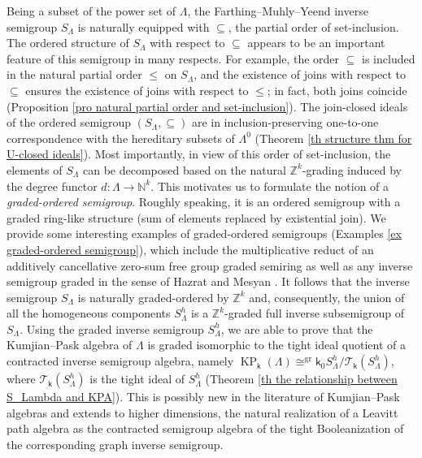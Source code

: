 \documentclass[a4paper,reqno,11pt]{amsart}
\numberwithin{equation}{section}
\theoremstyle{definition}
\theoremstyle{remark}
\newcommand{\gr}{\operatorname{gr}}
\newcommand{\KP}{\operatorname{KP}}
\begin{document}
Being a subset of the power set of $\Lambda$, the Farthing--Muhly--Yeend inverse semigroup $S_\Lambda$ is naturally equipped with $\subseteq$, the partial order of set-inclusion. The ordered structure of $S_\Lambda$ with respect to $\subseteq$ appears to be an important feature of this semigroup in many respects. For example, the order $\subseteq$ is included in the natural partial order $\le$ on $S_\Lambda$, and the existence of joins with respect to $\subseteq$ ensures the existence of joins with respect to $\le$; in fact, both joins coincide (Proposition \ref{pro natural partial order and set-inclusion}). The join-closed ideals of the ordered semigroup $(S_\Lambda,\subseteq)$ are in inclusion-preserving one-to-one correspondence with the hereditary subsets of $\Lambda^0$ (Theorem \ref{th structure thm for U-closed ideals}). Most importantly, in view of this order of set-inclusion, the elements of $S_\Lambda$ can be decomposed based on the natural $\mathbb{Z}^k$-grading induced by the degree functor $d:\Lambda\longrightarrow \mathbb{N}^k$. This motivates us to formulate the notion of a \emph{graded-ordered semigroup}. Roughly speaking, it is an ordered semigroup with a graded ring-like structure (sum of elements replaced by existential join). We provide some interesting examples of graded-ordered semigroups (Examples \ref{ex graded-ordered semigroup}), which include the multiplicative reduct of an additively cancellative zero-sum free group graded semiring as well as any inverse semigroup graded in the sense of Hazrat and Mesyan \cite{HazMes}. It follows that the inverse semigroup $S_\Lambda$ is naturally graded-ordered by $\mathbb{Z}^k$ and, consequently, the union of all the homogeneous components $S_\Lambda^h$ is a $\mathbb{Z}^k$-graded full inverse subsemigroup of $S_\Lambda$. Using the graded inverse semigroup $S_\Lambda^h$, we are able to prove that the Kumjian--Pask algebra of $\Lambda$ is graded isomorphic to the tight ideal quotient of a contracted inverse semigroup algebra, namely $\KP_\mathsf{k}(\Lambda)\cong^{\gr} \mathsf{k}_0S_\Lambda^h/{\mathcal{T}_\mathsf{k}(S_\Lambda^h)}$, where $\mathcal{T}_\mathsf{k}(S_\Lambda^h)$ is the tight ideal of $S_\Lambda^h$ (Theorem \ref{th the relationship between S_Lambda and KPA}). This is possibly new in the literature of Kumjian--Pask algebras and extends to higher dimensions, the natural realization of a Leavitt path algebra as the contracted semigroup algebra of the tight Booleanization of the corresponding graph inverse semigroup.
\end{document}
